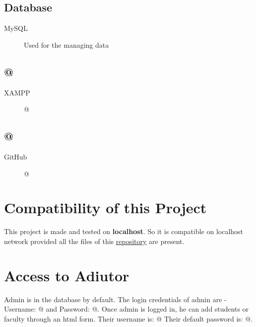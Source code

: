 \documentclass{article}
\begin{document}
\subsection{Database}
\begin{description}
    \item[MySQL] Used for the managing data
\end{description}

\subsection{@}
\begin{description}
    \item[XAMPP] @
\end{description}

\subsection{@}
\begin{description}
    \item[GitHub] @
\end{description}

\section{Compatibility of this Project}
This project is made and tested on \textbf{localhost}. So it is compatible on localhost network provided all the files of this  \href{https://github.com/samiitdh/SSL_Project}{repository} are present.

\section{Access to Adiutor}
Admin is in the database by default. The login credentials of admin are - Username: @ and Password: @. Once admin is logged in, he can add students or faculty through an html form. Their username is: @ Their default password is: @.
\end{document}
